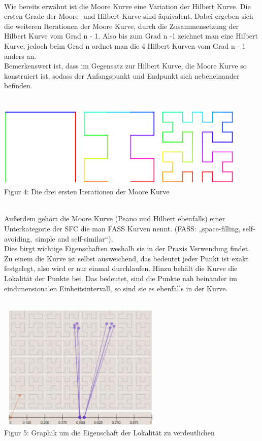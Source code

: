 \documentclass[course=erap]{aspdoc}
\begin{document}
\	\\
\newpage %
Wie bereits erwähnt ist die Moore Kurve eine Variation der Hilbert Kurve. Die ersten Grade der Moore- und Hilbert-Kurve sind äquivalent. Dabei ergeben sich die weiteren Iterationen der Moore Kurve, durch die Zusammensetzung der Hilbert Kurve vom Grad n - 1.  Also bis zum Grad n -1 zeichnet man eine Hilbert Kurve, jedoch beim Grad n ordnet man die 4 Hilbert Kurven vom Grad n - 1 anders an.\\ %
Bemerkenswert ist, dass im Gegensatz zur Hilbert Kurve, die Moore Kurve so konstruiert ist, sodass der Anfangspunkt und Endpunkt sich nebeneinander befinden.
\\
\\
\begin{center}
	\includegraphics[width=12cm, height=4cm]{Moore}\\	%
	\tiny Figur 4: Die drei ersten Iterationen der Moore Kurve
\end{center}
\	\\
Außerdem gehört die Moore Kurve (Peano und Hilbert ebenfalls) einer Unterkategorie der SFC die man FASS Kurven nennt. (FASS: „space-filling, self-avoiding, simple and self-similar“).\\
Dies birgt wichtige Eigenschaften weshalb sie in der Praxis Verwendung findet. Zu einem die Kurve ist selbst ausweichend, das bedeutet jeder Punkt ist exakt festgelegt, also wird er nur einmal durchlaufen. Hinzu behält die Kurve die Lokalität der Punkte bei. Das bedeutet, sind die Punkte nah beinander im eindimensionalen Einheitsintervall, so sind sie es ebenfalls in der Kurve. %
\\
\\
\begin{center}
	\includegraphics[width=8cm, height=6cm]{Locality}\\	%
	\tiny Figur 5: Graphik um die Eigenschaft der Lokalität zu verdeutlichen %
\end{center} 
\newpage 
\end{document}
